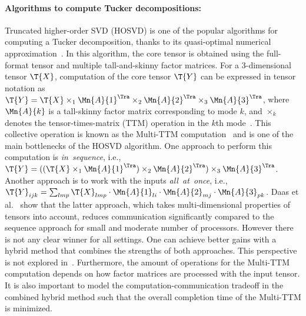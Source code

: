 \documentclass[a4paper,11pt, margin=2cm]{article}
\newcommand{\X}{\T{X}}
\newcommand{\Y}{\T{Y}}
\newcommand{\bora}[1]{{\color{magenta} \emph{#1}}}
\begin{document}
	\vspace*{-0.35cm}\paragraph{Algorithms to compute Tucker decompositions:}
	Truncated higher-order SVD (HOSVD) is one of the popular algorithms for computing a Tucker decomposition, thanks to its quasi-optimal numerical approximation~\cite{VVM-2012}.
	 In this algorithm, the core tensor is obtained using the full-format tensor and multiple tall-and-skinny factor matrices. 
	For a 3-dimensional tensor $\X$, computation of the core tensor $\Y$ can be expressed in tensor notation as $\Y = \X \times_1 {\Mn{A}{1}}^\Tra \times_2 {\Mn{A}{2}}^\Tra \times_3 {\Mn{A}{3}}^\Tra$, where 
	$\Mn{A}{k}$ is a tall-skinny factor matrix corresponding to mode $k$, and $\times_k$ denotes the tensor-times-matrix (TTM) operation in the $k$th mode~\cite{KB-SIAM-2009}. This collective operation is known as the Multi-TTM computation~\cite{ABGKR-SIMAX-2022} and is one of the main bottlenecks of the HOSVD algorithm. One approach to perform this computation is \emph{in~sequence}, i.e., $\Y = ((\X \times_1 {\Mn{A}{1}}^\Tra )\times_2 {\Mn{A}{2}}^\Tra) \times_3 {\Mn{A}{3}}^\Tra$. Another approach is to work with the inputs \emph{all~at~once}, i.e., $\Y_{ijk} = \sum_{lmp}\X_{lmp}\cdot\Mn{A}{1}_{li}\cdot \Mn{A}{2}_{mj}\cdot \Mn{A}{3}_{pk}$.
	Daas et al.~\cite{ABGKR-SIMAX-2022} show that the latter approach, which takes multi-dimensional properties of tensors into account, reduces communication significantly compared to the sequence approach for small and moderate number of processors. However there is not any clear winner for all settings. One can achieve better gains with a hybrid method that combines the strengths of both approaches. This perspective is not explored in~\cite{ABGKR-SIMAX-2022}.
	Furthermore, the amount of operations for the Multi-TTM computation depends on how factor matrices are processed with the input tensor. It is also important to model the computation-communication tradeoff in the combined hybrid method such that the overall completion time of the Multi-TTM is minimized.
	
\end{document}
